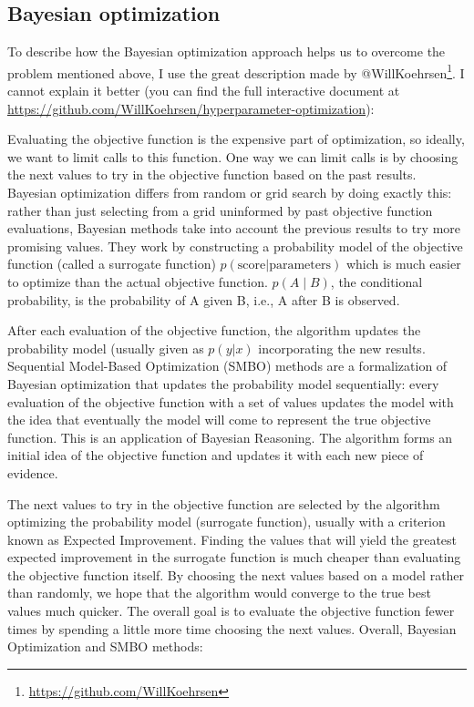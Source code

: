 \begin{subappendices}
\subsection{Bayesian optimization}

To describe how the Bayesian optimization approach helps us to overcome the problem mentioned above, I use the great description made by @WillKoehrsen\footnote{\url{https://github.com/WillKoehrsen}}. I cannot explain it better (you can find the full interactive document at\\ \url{https://github.com/WillKoehrsen/hyperparameter-optimization}):

\begin{itshape}
Evaluating the objective function is the expensive part of optimization, so ideally, we want to limit calls to this function. One way we can limit calls is by choosing the next values to try in the objective function based on the past results. Bayesian optimization differs from random or grid search by doing exactly this: rather than just selecting from a grid uninformed by past objective function evaluations, Bayesian methods take into account the previous results to try more promising values. They work by constructing a probability model of the objective function (called a surrogate function) $p(\text{score} | \text{parameters})$ which is much easier to optimize than the actual objective function. $p (A\mid B)$, the conditional probability, is the probability of A given B, i.e., A after B is observed.

After each evaluation of the objective function, the algorithm updates the probability model (usually given as $p(y | x)$ incorporating the new results. Sequential Model-Based Optimization ({SMBO}) methods are a formalization of Bayesian optimization that updates the probability model sequentially: every evaluation of the objective function with a set of values updates the model with the idea that eventually the model will come to represent the true objective function. This is an application of Bayesian Reasoning. The algorithm forms an initial idea of the objective function and updates it with each new piece of evidence.

The next values to try in the objective function are selected by the algorithm optimizing the probability model (surrogate function), usually with a criterion known as Expected Improvement. Finding the values that will yield the greatest expected improvement in the surrogate function is much cheaper than evaluating the objective function itself. By choosing the next values based on a model rather than randomly, we hope that the algorithm would converge to the true best values much quicker. The overall goal is to evaluate the objective function fewer times by spending a little more time choosing the next values. Overall, Bayesian Optimization and {SMBO} methods:


\end{itshape}
\end{subappendices}
